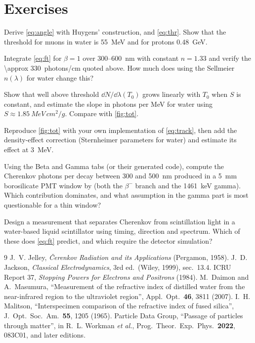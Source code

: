 \section{Exercises}
\begin{exercise}[A]
Derive \cref{eq:angle} with Huygens' construction, and \cref{eq:thr}. Show that the threshold for muons in water is \SI{55}{MeV} and for protons \SI{0.48}{GeV}.
\end{exercise}
\begin{exercise}[A]
Integrate \cref{eq:ft} for $\beta = 1$ over 300--\SI{600}{nm} with constant $n = 1.33$ and verify the \SI{\approx 330}{photons/cm} quoted above. How much does using the Sellmeier $n(\lambda)$ for water change this?
\end{exercise}
\begin{exercise}[A]
Show that well above threshold $\dd N/\dd\lambda(T_0)$ grows linearly with $T_0$ when $S$ is constant, and estimate the slope in photons per MeV for water using $S\approx\SI{1.85}{MeV\,cm^2/g}$. Compare with \cref{fig:tot}.
\end{exercise}
\begin{exercise}[P]
Reproduce \cref{fig:tot} with your own implementation of \cref{eq:track}, then add the density-effect correction (Sternheimer parameters for water) and estimate its effect at \SI{3}{MeV}.
\end{exercise}
\begin{exercise}[P]
Using the Beta and Gamma tabs (or their generated code), compute the Cherenkov photons per decay between 300 and \SI{500}{nm} produced in a \SI{5}{mm} borosilicate PMT window by  (both the $\beta^-$ branch and the \SI{1461}{keV} gamma). Which contribution dominates, and what assumption in the gamma part is most questionable for a thin window?
\end{exercise}
\begin{exercise}[R]
Design a measurement that separates Cherenkov from scintillation light in a water-based liquid scintillator using timing, direction and spectrum. Which of these does \cref{eq:ft} predict, and which require the detector simulation?
\end{exercise}

\begin{thebibliography}{9}
 J.~V. Jelley, \emph{\v{C}erenkov Radiation and its Applications} (Pergamon, 1958).
 J.~D. Jackson, \emph{Classical Electrodynamics}, 3rd ed.\ (Wiley, 1999), sec.~13.4.
 ICRU Report 37, \emph{Stopping Powers for Electrons and Positrons} (1984).
 M.~Daimon and A.~Masumura, ``Measurement of the refractive index of distilled water from the near-infrared region to the ultraviolet region'', Appl.\ Opt.\ \textbf{46}, 3811 (2007).
 I.~H. Malitson, ``Interspecimen comparison of the refractive index of fused silica'', J.\ Opt.\ Soc.\ Am.\ \textbf{55}, 1205 (1965).
 Particle Data Group, ``Passage of particles through matter'', in R.~L. Workman \emph{et al.}, Prog.\ Theor.\ Exp.\ Phys.\ \textbf{2022}, 083C01, and later editions.
\end{thebibliography}

